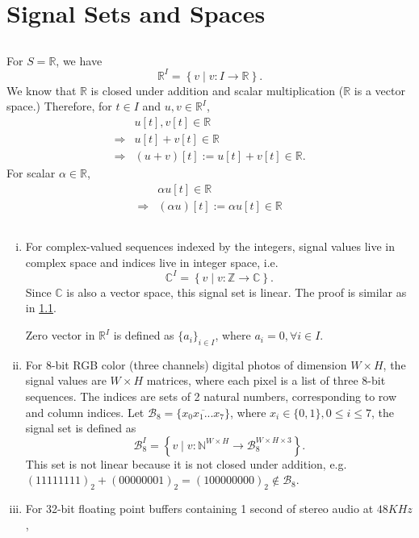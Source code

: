 \section{Signal Sets and Spaces}\label{sec:part4}

\subsection{}\label{subsec:p4-a}
For $S = \mathbb{R}$, we have
\[\mathbb{R}^I = \left\{v \mid v: I \rightarrow \mathbb{R} \right\}.\]
We know that $\mathbb{R}$ is closed under addition and scalar multiplication ($\mathbb{R}$ is a vector space.) Therefore, for $t \in I$ and $u,v \in \mathbb{R}^I$,
\begin{align*}
	&u[t], v[t] \in \mathbb{R} \\
	\Rightarrow &u[t] + v[t] \in \mathbb{R} \\
	\Rightarrow &(u+v)[t] := u[t] + v[t] \in \mathbb{R} .
\end{align*}
For scalar $\alpha \in \mathbb{R}$,
\begin{align*}
	&\alpha u[t] \in \mathbb{R} \\
	\Rightarrow &(\alpha u)[t] := \alpha u[t] \in \mathbb{R}
\end{align*}


\subsection{}\label{subsec:p4-b}
\begin{enumerate}[(i)]
	\item For complex-valued sequences indexed by the integers, signal values live in complex space and indices live in integer space, i.e.
	\[\mathbb{C}^I = \left\{ v \mid v: \mathbb{Z} \rightarrow \mathbb{C}\right\}. \]
	Since $\mathbb{C}$ is also a vector space, this signal set is linear. The proof is similar as in \ref{subsec:p4-a}.
	
	Zero vector in $\mathbb{R}^I$ is defined as $\{ a_i \}_{i \in I}$, where $a_i = 0, \forall i \in I$.
	
	\item For 8-bit RGB color (three channels) digital photos of dimension $W \times H$, the signal values are $W \times H$ matrices, where each pixel is a list of three 8-bit sequences. The indices are sets of 2 natural numbers, corresponding to row and column indices. Let $\mathcal{B}_8 = \{\overline{x_0 x_1 ... x_7}\}$, where $x_i \in \{0,1\}, 0 \leq i \leq 7$, the signal set is defined as
	\[\mathcal{B}_8^I = \left\{ v \mid v : \mathbb{N}^{W \times H} \rightarrow \mathcal{B}_8^{W \times H \times 3}\right\}.\]
	This set is not linear because it is not closed under addition, e.g. $(11111111)_2 + (00000001)_2 = (100000000)_2 \notin \mathcal{B}_8$.
	\[\]
	
	\item For 32-bit floating point buffers containing 1 second of stereo audio at $48KHz$,
\end{enumerate}


